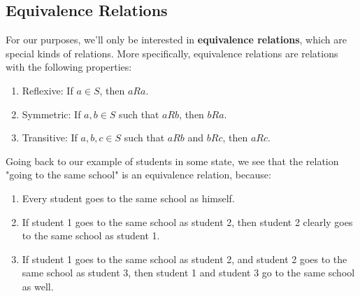 \documentclass[11pt]{report}
\begin{document}
\subsection{Equivalence Relations}
For our purposes, we'll only be interested in \textbf{equivalence relations}, which are special kinds of relations. More specifically, equivalence relations are relations with the following properties:
\begin{enumerate}
\item Reflexive: If $a \in S$, then $aRa$.
\item Symmetric: If $a,b \in S$ such that $aRb$, then $bRa$.
\item Transitive: If $a,b,c \in S$ such that $aRb$ and $bRc$, then $aRc$.
\end{enumerate}
Going back to our example of students in some state, we see that the relation "going to the same school" is an equivalence relation, because:
\begin{enumerate}
\item Every student goes to the same school as himself.
\item If student 1 goes to the same school as student 2, then student 2 clearly goes to the same school as student 1.
\item If student 1 goes to the same school as student 2, and student 2 goes to the same school as student 3, then student 1 and student 3 go to the same school as well.
\end{enumerate}
\end{document}
